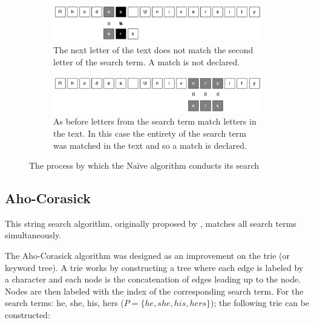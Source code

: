 \documentclass{article}
\begin{document}
\begin{figure}[h!bt]
  \begin{subfigure}{\textwidth}
  \makeatletter
  \includegraphics[width=\textwidth]{images/naive-4}
  \caption{The next letter of the text does not match the second letter of the search term. A match is not declared.}
  \end{subfigure}
  
  \begin{subfigure}{\textwidth}
  \makeatletter
  \includegraphics[width=\textwidth]{images/naive-5}
  \caption{As before letters from the search term match letters in the text. In this case the entirety of the search term was matched in the text and so a match is declared.}
  \end{subfigure}
  
  \caption{The process by which the Na{\"i}ve algorithm conducts its search}
  
\end{figure}

\subsection{Aho-Corasick}
This string search algorithm, originally proposed by \cite{Aho1975}, matches all search terms simultaneously.

The Aho-Corasick algorithm was designed as an improvement on the trie (or keyword tree). A trie works by constructing a tree where each edge is labeled by a character and each node is the concatenation of edges leading up to the node. Nodes are then labeled with the index of the corresponding search term. For the search terms: he, she, his, hers (\(P = \{he, she, his, hers\}\)); the following trie can be constructed: 
\end{document}
